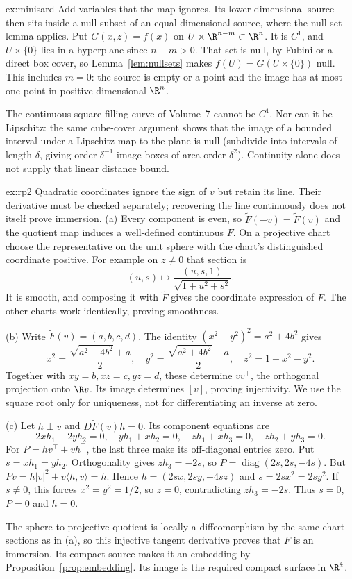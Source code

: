 \begin{solution}{ex:minisard}
\idea Add variables that the map ignores. Its lower-dimensional source then sits inside a null subset of an equal-dimensional source, where the null-set lemma applies.
\writeup Put $G(x,z)=f(x)$ on $U\times\R^{n-m}\subset\R^n$. It is $C^1$, and $U\times\{0\}$ lies in a hyperplane since $n-m>0$. That set is null, by Fubini or a direct box cover, so Lemma~\ref{lem:nullsets} makes $f(U)=G(U\times\{0\})$ null. This includes $m=0$: the source is empty or a point and the image has at most one point in positive-dimensional $\R^n$.

The continuous square-filling curve of Volume~7 cannot be $C^1$. Nor can it be Lipschitz: the same cube-cover argument shows that the image of a bounded interval under a Lipschitz map to the plane is null (subdivide into intervals of length $\delta$, giving order $\delta^{-1}$ image boxes of area order $\delta^2$). Continuity alone does not supply that linear distance bound.
\end{solution}

\begin{solution}{ex:rp2}
\idea Quadratic coordinates ignore the sign of $v$ but retain its line. Their derivative must be checked separately; recovering the line continuously does not itself prove immersion.
\writeup (a) Every component is even, so $\tilde F(-v)=\tilde F(v)$ and the quotient map induces a well-defined continuous $F$. On a projective chart choose the representative on the unit sphere with the chart's distinguished coordinate positive. For example on $z\ne0$ that section is
\[
(u,s)\longmapsto\frac{(u,s,1)}{\sqrt{1+u^2+s^2}}.
\]
It is smooth, and composing it with $\tilde F$ gives the coordinate expression of $F$. The other charts work identically, proving smoothness.

(b) Write $\tilde F(v)=(a,b,c,d)$. The identity $(x^2+y^2)^2=a^2+4b^2$ gives
\[
x^2=\frac{\sqrt{a^2+4b^2}+a}{2},\quad
y^2=\frac{\sqrt{a^2+4b^2}-a}{2},\quad z^2=1-x^2-y^2.
\]
Together with $xy=b,xz=c,yz=d$, these determine $vv^\top$, the orthogonal projection onto $\R v$. Its image determines $[v]$, proving injectivity. We use the square root only for uniqueness, not for differentiating an inverse at zero.

(c) Let $h\perp v$ and $D\tilde F(v)h=0$. Its component equations are
\[
2xh_1-2yh_2=0,\quad yh_1+xh_2=0,\quad zh_1+xh_3=0,\quad zh_2+yh_3=0.
\]
For $P=hv^\top+vh^\top$, the last three make its off-diagonal entries zero. Put $s=xh_1=yh_2$. Orthogonality gives $zh_3=-2s$, so $P=\operatorname{diag}(2s,2s,-4s)$. But $Pv=h|v|^2+v\langle h,v\rangle=h$. Hence $h=(2sx,2sy,-4sz)$ and $s=2sx^2=2sy^2$. If $s\ne0$, this forces $x^2=y^2=1/2$, so $z=0$, contradicting $zh_3=-2s$. Thus $s=0$, $P=0$ and $h=0$.

The sphere-to-projective quotient is locally a diffeomorphism by the same chart sections as in (a), so this injective tangent derivative proves that $F$ is an immersion. Its compact source makes it an embedding by Proposition~\ref{prop:embedding}. Its image is the required compact surface in $\R^4$.
\end{solution}

